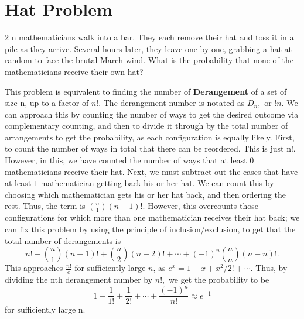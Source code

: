 \documentclass[11pt,twosided]{article}
\begin{document}
\section{Hat Problem}
\begin{problem}
	2 n mathematicians walk into a bar. They each remove their hat and toss it in a pile as they arrive. Several hours later, they leave one by one, grabbing a hat at random to face the brutal March wind. What is the probability that none of the mathematicians receive their own hat?
\end{problem}
\begin{solution}
	This problem is equivalent to finding the number of \textbf{Derangement} of a set of size n, up to a factor of $n!$. The derangement number is notated as $D_n,$ or $!n.$
	\newline
	We can approach this by counting the number of ways to get the desired outcome via complementary counting, and then to divide it through by the total number of arrangements to get the probability, as each configuration is equally likely. First, to count the number of ways in total that there can be reordered. This is just n!. However, in this, we have counted the number of ways that at least $0$ mathematicians receive their hat. Next, we must subtract out the cases that have at least $1$ mathematician getting back his or her hat. We can count this by choosing which mathematician gets his or her hat back, and then ordering the rest. Thus, the term is ${n\choose1}\left(n-1\right)!.$ However, this overcounts those configurations for which more than one mathematician receives their hat back; we can fix this problem by using the principle of inclusion/exclusion, to get that the total number of derangements is \[n!-{n\choose1}\left(n-1\right)!+{n\choose2}\left(n-2\right)!+\cdots+(-1)^n{n\choose n}\left(n-n\right)!.\]
	This approaches $\frac{n!}{e}$ for sufficiently large $n$, as $e^x=1+x+x^2/2!+\cdots.$ Thus, by dividing the nth derangement number by $n!,$ we get the probability to be \[1-\frac{1}{1!}+\frac{1}{2!}+\cdots+\frac{(-1)^n}{n!}\approx e^{-1}\] for sufficiently large n.
\end{solution}
\end{document}
